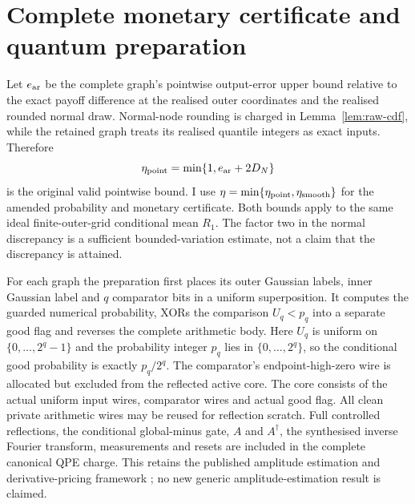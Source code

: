 \documentclass[11pt]{article}
\begin{document}
\section{Complete monetary certificate and quantum preparation}

Let $e_{\rm ar}$ be the complete graph's pointwise output-error upper
bound relative to the exact payoff difference at the realised outer
coordinates and the realised rounded normal draw. Normal-node rounding
is charged in Lemma~\ref{lem:raw-cdf}, while the retained graph treats
its realised quantile integers as exact inputs. Therefore
\begin{equation}
 \eta_{\rm point}=\min\{1,e_{\rm ar}+2D_N\}
\end{equation}
is the original valid pointwise bound. I use
$\eta=\min\{\eta_{\rm point},\eta_{\rm smooth}\}$
for the amended probability and monetary certificate. Both bounds apply
to the same ideal finite-outer-grid conditional mean $R_1$. The factor two in the
normal discrepancy is a sufficient bounded-variation estimate, not a
claim that the discrepancy is attained.

For each graph the preparation first places its outer Gaussian labels,
inner Gaussian label and $q$ comparator bits in a uniform superposition.
It computes the guarded numerical probability, XORs the comparison
$U_q<p_q$ into a separate good flag and reverses the complete arithmetic
body. Here $U_q$ is uniform on $\{0,\ldots,2^q-1\}$ and the
probability integer $p_q$ lies in $\{0,\ldots,2^q\}$, so the
conditional good probability is exactly $p_q/2^q$. The comparator's
endpoint-high-zero wire is allocated but excluded from the reflected
active core. The core consists of the actual uniform input wires,
comparator wires and actual good flag. All clean private arithmetic
wires may be reused for reflection scratch. Full controlled reflections,
the conditional global-minus gate, $A$ and $A^\dagger$, the synthesised
inverse Fourier transform, measurements and resets are included in
the complete canonical QPE charge. This retains the published amplitude
estimation and derivative-pricing framework \citep{brassard,rebentrost};
no new generic amplitude-estimation result is claimed.
\end{document}
